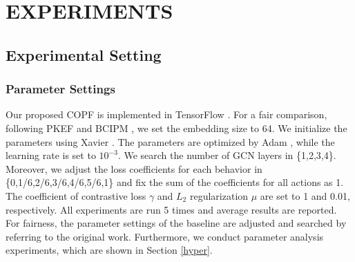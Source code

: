 \section{EXPERIMENTS}
\label{experiments}

\begin{table}[t]
\setlength{\abovecaptionskip}{0cm}
\setlength{\belowcaptionskip}{0mm}
\caption{Statistics of evaluation datasets.}
\centering
{}
\vspace{-3mm}
\label{dataset}
\end{table}

\subsection{Experimental Setting}
\subsubsection{Parameter Settings}
Our proposed COPF is implemented in TensorFlow \cite{TensorFlow}. For a fair comparison, following PKEF \cite{pkef} and BCIPM \cite{bipn}, we set the embedding size to 64. We initialize the parameters using Xavier \cite{xavier}. The parameters are optimized by Adam \cite{adam}, while the learning rate is set to $10^{-3}$. We search the number of GCN layers in \{1,2,3,4\}. Moreover, we adjust the loss coefficients for each behavior in \{0,1/6,2/6,3/6,4/6,5/6,1\} and fix the sum of the coefficients for all actions as 1. The coefficient of contrastive loss $\gamma$ and $L_2$ regularization $\mu$ are set to 1 and 0.01, respectively. All experiments are run 5 times and average results are reported. For fairness, the parameter settings of the baseline are adjusted and searched by referring to the original work. Furthermore, we conduct parameter analysis experiments, which are shown in Section \ref{hyper}.

